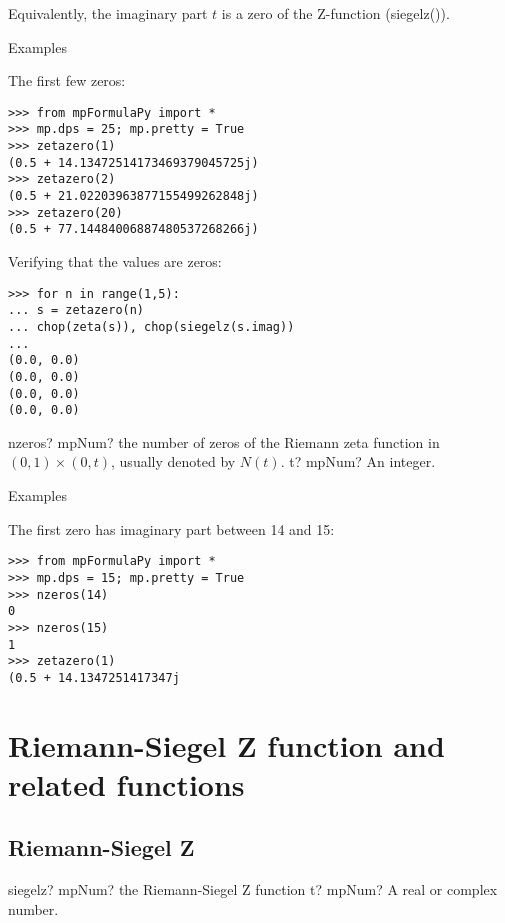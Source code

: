 Equivalently, the imaginary part $t$ is a zero of the Z-function (siegelz()).

Examples

The first few zeros:

\begin{lstlisting}
>>> from mpFormulaPy import *
>>> mp.dps = 25; mp.pretty = True
>>> zetazero(1)
(0.5 + 14.13472514173469379045725j)
>>> zetazero(2)
(0.5 + 21.02203963877155499262848j)
>>> zetazero(20)
(0.5 + 77.14484006887480537268266j)
\end{lstlisting}

Verifying that the values are zeros:

\begin{lstlisting}
>>> for n in range(1,5):
... s = zetazero(n)
... chop(zeta(s)), chop(siegelz(s.imag))
...
(0.0, 0.0)
(0.0, 0.0)
(0.0, 0.0)
(0.0, 0.0)
\end{lstlisting}


\begin{mpFunctionsExtract}
	\mpFunctionOne
	{nzeros? mpNum? the number of zeros of the Riemann zeta function in $(0,1) \times (0,t)$, usually denoted by $N(t)$.}
	{t? mpNum? An integer.}	
\end{mpFunctionsExtract}


Examples

The first zero has imaginary part between 14 and 15:

\begin{lstlisting}
>>> from mpFormulaPy import *
>>> mp.dps = 15; mp.pretty = True
>>> nzeros(14)
0
>>> nzeros(15)
1
>>> zetazero(1)
(0.5 + 14.1347251417347j
\end{lstlisting}


\newpage
\section{Riemann-Siegel Z function and related functions}

\subsection{Riemann-Siegel Z}

\begin{mpFunctionsExtract}
	\mpFunctionOne
	{siegelz? mpNum? the Riemann-Siegel Z function}
	{t? mpNum? A real or complex number.}
\end{mpFunctionsExtract}

